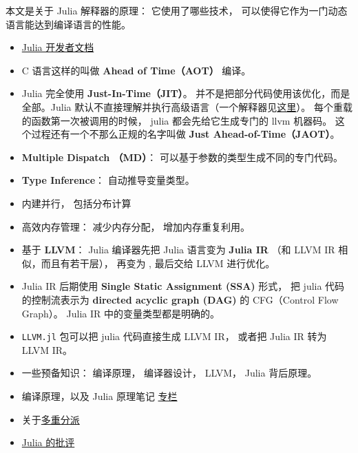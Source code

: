 
本文是关于 Julia 解释器的原理： 它使用了哪些技术， 可以使得它作为一门动态语言能达到编译语言的性能。

\begin{itemize}
\item \href{https://docs.julialang.org/en/v1/devdocs/init/}{Julia 开发者文档}
\item C 语言这样的叫做 \textbf{Ahead of Time（AOT）} 编译。
\item Julia 完全使用 \textbf{Just-In-Time（JIT）}。 并不是把部分代码使用该优化，而是全部。Julia 默认不直接理解并执行高级语言（一个解释器见\href{https://juliadebug.github.io/JuliaInterpreter.jl/stable/}{这里}）。 每个重载的函数第一次被调用的时候， julia 都会先给它生成专门的 llvm 机器码。 这个过程还有一个不那么正规的名字叫做 \textbf{Just Ahead-of-Time（JAOT）}。
\item \textbf{Multiple Dispatch （MD）}： 可以基于参数的类型生成不同的专门代码。
\item \textbf{Type Inference}： 自动推导变量类型。
\item 内建并行， 包括分布计算
\item 高效内存管理： 减少内存分配， 增加内存重复利用。
\item 基于 \textbf{LLVM}： Julia 编译器先把 Julia 语言变为 \textbf{Julia IR} （和 LLVM IR 相似，而且有若干层）， 再变为 , 最后交给 LLVM 进行优化。
\item Julia IR 后期使用 \textbf{Single Static Assignment (SSA)} 形式， 把 julia 代码的控制流表示为 \textbf{directed acyclic graph (DAG)} 的 CFG（Control Flow Graph）。 Julia IR 中的变量类型都是明确的。
\item \verb`LLVM.jl` 包可以把 julia 代码直接生成 LLVM IR， 或者把 Julia IR 转为 LLVM IR。
\item 一些预备知识： 编译原理， 编译器设计， LLVM， Julia 背后原理。
\item 编译原理，以及 Julia 原理笔记 \href{https://learn.lianglianglee.com/\%e4\%b8\%93\%e6\%a0\%8f/\%e7\%bc\%96\%e8\%af\%91\%e5\%8e\%9f\%e7\%90\%86\%e5\%ae\%9e\%e6\%88\%98\%e8\%af\%be/23\%20Julia\%e7\%bc\%96\%e8\%af\%91\%e5\%99\%a8\%ef\%bc\%88\%e4\%ba\%8c\%ef\%bc\%89\%ef\%bc\%9a\%e5\%a6\%82\%e4\%bd\%95\%e5\%88\%a9\%e7\%94\%a8LLVM\%e7\%9a\%84\%e4\%bc\%98\%e5\%8c\%96\%e5\%92\%8c\%e5\%90\%8e\%e7\%ab\%af\%e5\%8a\%9f\%e8\%83\%bd\%ef\%bc\%9f.md}{专栏}
\item 关于\href{https://zhuanlan.zhihu.com/p/569704329}{多重分派}
\item \href{https://zhuanlan.zhihu.com/p/515863922}{Julia 的批评}
\end{itemize}

